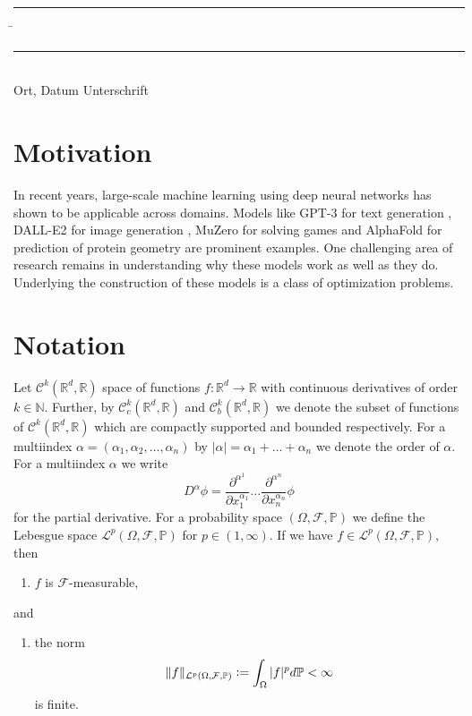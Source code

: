 \documentclass[12pt]{article}
\theoremstyle{definition}
\numberwithin{equation}{section}
\newcommand{\N}{\mathbb{N}}
\newcommand{\R}{\mathbb{R}}
\newcommand{\BP}{\mathbb{P}}
\newcommand{\CF}{\mathcal{F}}
\newcommand{\CL}{\mathcal{L}}
\newcommand{\CC}{\mathcal{C}}
\newcommand{\defeq}{\vcentcolon=}
\begin{document}
\vspace*{3em}

\begin{tabbing}
  \rule{.4\textwidth}{1pt} \hspace*{.2\textwidth}
  \= \rule{.4\textwidth}{1pt} \\
  Ort, Datum \> Unterschrift
\end{tabbing}

\newpage
\mbox{}
\newpage
\tableofcontents
\newpage
\listoffigures
\newpage
\printnomenclature
\newpage
\section{Motivation}
\label{sec:Motivation}
In recent years, large-scale machine learning using deep neural networks has shown to be applicable across domains. Models like GPT-3 for text generation \autocite{brownLanguageModelsAre2020}, DALL-E2 for image generation \autocite{rameshHierarchicalTextConditionalImage2022}, MuZero for solving games \autocite{schrittwieserMasteringAtariGo2020} and AlphaFold for prediction of protein geometry \autocite{jumperHighlyAccurateProtein2021} are prominent examples.
One challenging area of research remains in understanding why these models work as well as they do. Underlying the construction of these models is a class of optimization problems.
\section{Notation}
Let $\CC^k(\R^d, \R)$ space of functions $f: \R^d \rightarrow \R$ with continuous derivatives of order $k \in \N$. Further, by $\CC_c^k(\R^d, \R)$ and $\CC_b^k(\R^d, \R)$ we denote the subset of functions of $\CC^k(\R^d, \R)$ which are compactly supported and bounded respectively.
For a multiindex $\alpha = (\alpha_1, \alpha_2, \dots, \alpha_n)$ by $|\alpha| = \alpha_1 + \dots + \alpha_n$ we denote the order of $\alpha$.
For a multiindex $\alpha$ we write 
\begin{equation*}
  D^{\alpha} \phi = \frac{\partial^{\alpha^1}}{\partial x_1^{\alpha_1}}\dots\frac{\partial^{\alpha^n}}{\partial x_n^{\alpha_n}} \phi
\end{equation*}
for the partial derivative.
For a probability space $(\Omega, \CF, \BP)$ we define the Lebesgue space $\CL^p(\Omega, \CF, \BP)$ for $p \in (1,\infty)$. If we have $f \in\CL^p(\Omega, \CF, \BP)$, then
\begin{enumerate}[label=(\roman*)]
  \item $f$ is $\CF$-measurable,
\end{enumerate}
and
\begin{enumerate}[resume, label=(\roman*)]
  \item the norm 
  \begin{equation*}
    \lVert f \rVert_{\CL^p(\Omega, \CF, \BP)} \defeq \int_{\Omega} |f|^p d\BP < \infty
  \end{equation*}
  is finite.
\end{enumerate}
\end{document}
